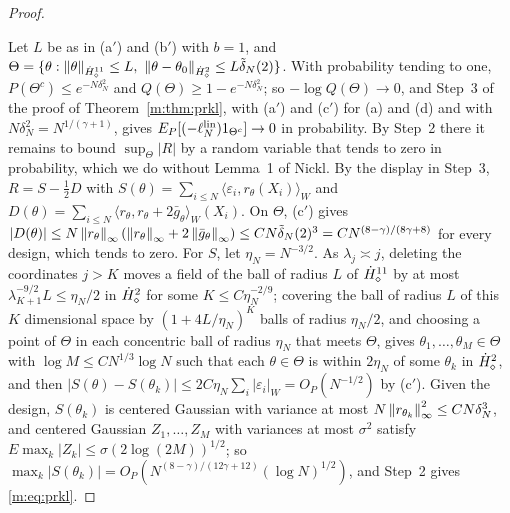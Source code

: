 \begin{proof}
\begin{enumerate}[label=(\alph*$'$),nosep]
\end{enumerate}
Let $L$ be as in (a$'$) and (b$'$) with $b=1$, and $\Theta=\{\theta:\left\|\theta\right\|_{\dot H^{11}_\diamond}\le L,\ \left\|\theta-\theta_0\right\|_{\dot H^{2}_\diamond}\le L\tilde\delta_N(2)\}$. With probability tending to one, $P(\Theta^c)\le e^{-N\delta_N^2}$ and $Q(\Theta)\ge1-e^{-N\delta_N^2}$; so $-\log Q(\Theta)\to0$, and Step~3 of the proof of Theorem~\ref{m:thm:prkl}, with (a$'$) and (c$'$) for (a) and (d) and with $N\delta_N^2=N^{1/(\gamma+1)}$, gives $E_P[(-\ell^{\rm lin}_N)1_{\Theta^c}]\to0$ in probability. By Step~2 there it remains to bound $\sup_\Theta|R|$ by a random variable that tends to zero in probability, which we do without Lemma~1 of Nickl. By the display in Step~3, $R=S-\tfrac12D$ with $S(\theta)=\sum_{i\le N}\langle\varepsilon_i,r_\theta(X_i)\rangle_W$ and $D(\theta)=\sum_{i\le N}\langle r_\theta,r_\theta+2\bar g_\theta\rangle_W(X_i)$. On $\Theta$, (c$'$) gives $|D(\theta)|\le N\left\|r_\theta\right\|_\infty(\left\|r_\theta\right\|_\infty+2\left\|\bar g_\theta\right\|_\infty)\le CN\tilde\delta_N(2)^3=CN^{(8-\gamma)/(8\gamma+8)}$ for every design, which tends to zero. For $S$, let $\eta_N=N^{-3/2}$. As $\lambda_j\asymp j$, deleting the coordinates $j>K$ moves a field of the ball of radius $L$ of $\dot H^{11}_\diamond$ by at most $\lambda_{K+1}^{-9/2}L\le\eta_N/2$ in $\dot H^{2}_\diamond$ for some $K\le C\eta_N^{-2/9}$; covering the ball of radius $L$ of this $K$ dimensional space by $(1+4L/\eta_N)^K$ balls of radius $\eta_N/2$, and choosing a point of $\Theta$ in each concentric ball of radius $\eta_N$ that meets $\Theta$, gives $\theta_1,\dots,\theta_M\in\Theta$ with $\log M\le CN^{1/3}\log N$ such that each $\theta\in\Theta$ is within $2\eta_N$ of some $\theta_k$ in $\dot H^{2}_\diamond$, and then $|S(\theta)-S(\theta_k)|\le2C\eta_N\sum_i|\varepsilon_i|_W=O_P(N^{-1/2})$ by (c$'$). Given the design, $S(\theta_k)$ is centered Gaussian with variance at most $N\left\|r_{\theta_k}\right\|^2_\infty\le CN\delta_N^3$, and centered Gaussian $Z_1,\dots,Z_M$ with variances at most $\sigma^2$ satisfy $E\max_k|Z_k|\le\sigma(2\log(2M))^{1/2}$; so $\max_k|S(\theta_k)|=O_P(N^{(8-\gamma)/(12\gamma+12)}(\log N)^{1/2})$, and Step~2 gives \eqref{m:eq:prkl}.


\end{proof}
